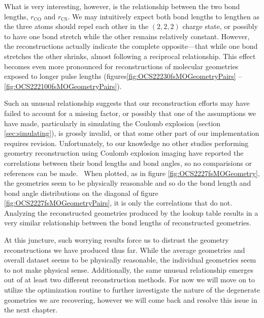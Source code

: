 What is very interesting, however, is the relationship between the two bond lengths, $r_\mathrm{CO}$ and $r_\mathrm{CS}$. We may intuitively expect both bond lengths to lengthen as the three atoms should repel each other in the $(2,2,2)$ charge state, or possibly to have one bond stretch while the other remains relatively constant. However, the reconstructions actually indicate the complete opposite---that while one bond stretches the other shrinks, almost following a reciprocal relationship. This effect becomes even more pronounced for reconstructions of molecular geometries exposed to longer pulse lengths (figures\ref{fig:OCS22230fsMOGeometryPairs} -- \ref{fig:OCS222100fsMOGeometryPairs}).

Such an unusual relationship suggests that our reconstruction efforts may have failed to account for a missing factor, or possibly that one of the assumptions we have made, particularly in simulating the Coulomb explosion (section \ref{sec:simulating}), is grossly invalid, or that some other part of our implementation requires revision. Unfortunately, to our knowledge no other studies performing geometry reconstruction using Coulomb explosion imaging have reported the correlations between their bond lengths and bond angles, so no comparisions or references can be made.\footnotemark~ When plotted, as in figure \ref{fig:OCS2227fsMOGeometry}, the geometries seem to be physically reasonable and so do the bond length and bond angle distributions on the diagonal of figure \ref{fig:OCS2227fsMOGeometryPairs}, it is only the correlations that do not. Analyzing the reconstructed geometries produced by the lookup table results in a very similar relationship between the bond lengths of reconstructed geometries.


At this juncture, such worrying results force us to distrust the geometry reconstructions we have produced thus far. While the average geometries and overall dataset seems to be physically reasonable, the individual geometries seem to not make physical sense. Additionally, the same unusual relationship emerges out of at least two different reconstruction methods. For now we will move on to utilize the optimization routine to further investigate the nature of the degenerate geometries we are recovering, however we will come back and resolve this issue in the next chapter.

